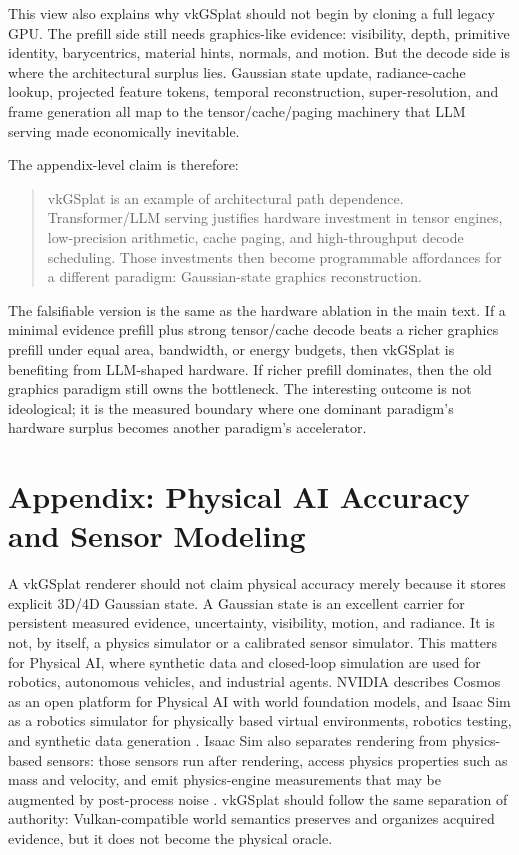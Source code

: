 \documentclass[11pt]{article}
\begin{document}
This view also explains why vkGSplat should not begin by cloning a full legacy
GPU. The prefill side still needs graphics-like evidence: visibility, depth,
primitive identity, barycentrics, material hints, normals, and motion. But the
decode side is where the architectural surplus lies. Gaussian state update,
radiance-cache lookup, projected feature tokens, temporal reconstruction,
super-resolution, and frame generation all map to the tensor/cache/paging
machinery that LLM serving made economically inevitable.

The appendix-level claim is therefore:

\begin{quote}
vkGSplat is an example of architectural path dependence. Transformer/LLM
serving justifies hardware investment in tensor engines, low-precision
arithmetic, cache paging, and high-throughput decode scheduling. Those
investments then become programmable affordances for a different paradigm:
Gaussian-state graphics reconstruction.
\end{quote}

The falsifiable version is the same as the hardware ablation in the main text.
If a minimal evidence prefill plus strong tensor/cache decode beats a
richer graphics prefill under equal area, bandwidth, or energy budgets, then
vkGSplat is benefiting from LLM-shaped hardware. If richer prefill dominates,
then the old graphics paradigm still owns the bottleneck. The interesting
outcome is not ideological; it is the measured boundary where one dominant
paradigm's hardware surplus becomes another paradigm's accelerator.


\section{Appendix: Physical AI Accuracy and Sensor Modeling}

A vkGSplat renderer should not claim physical accuracy merely because it stores
explicit 3D/4D Gaussian state. A Gaussian state is an excellent carrier for
persistent measured evidence, uncertainty, visibility, motion, and radiance. It
is not, by itself, a physics simulator or a calibrated sensor simulator. This
matters for Physical AI, where synthetic data and closed-loop simulation are
used for robotics, autonomous vehicles, and industrial agents. NVIDIA describes
Cosmos as an open platform for Physical AI with world foundation models, and
Isaac Sim as a robotics simulator for physically based virtual environments,
robotics testing, and synthetic data generation \cite{nvidia2026cosmos,
nvidia2026isaacsim}. Isaac Sim also separates rendering from physics-based
sensors: those sensors run after rendering, access physics properties such as
mass and velocity, and emit physics-engine measurements that may be augmented by
post-process noise \cite{nvidia2026isaacphysicssensors}. vkGSplat should follow
the same separation of authority: Vulkan-compatible world semantics preserves
and organizes acquired evidence, but it does not become the physical oracle.
\end{document}
